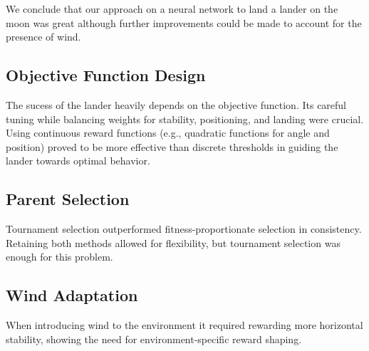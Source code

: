 \documentclass{article}
\begin{document}
We conclude that our approach on a neural network to land a lander on the moon was great although further improvements could be made to account for the presence of wind.


\subsection{Objective Function Design}

The sucess of the lander heavily depends on the objective function. Its careful tuning while balancing weights for stability, positioning, and landing were crucial.
Using continuous reward functions (e.g., quadratic functions for angle and position) proved to be more effective than discrete thresholds in guiding the lander towards optimal behavior.

\subsection{Parent Selection}
Tournament selection outperformed fitness-proportionate selection in consistency. Retaining both methods allowed for flexibility, but tournament selection was enough for this problem.

\subsection{Wind Adaptation}
When introducing wind to the environment it required rewarding more horizontal stability, showing the need for environment-specific reward shaping.
\end{document}
